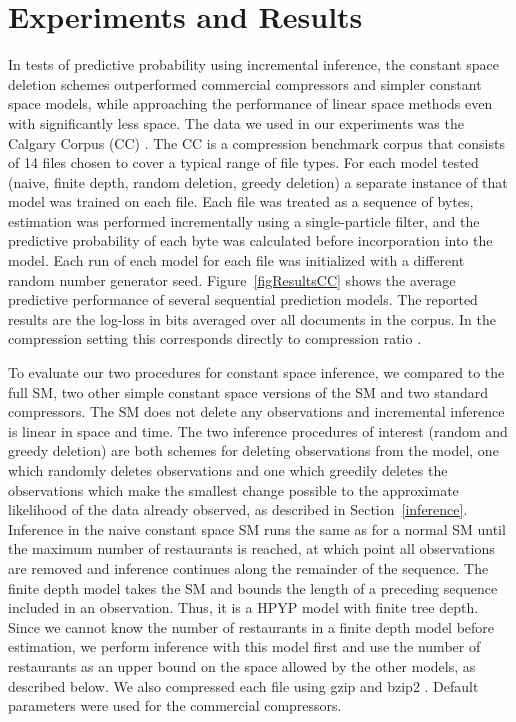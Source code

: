 \section{Experiments and Results}
\label{results}

In tests of predictive probability using incremental inference, the constant space deletion schemes outperformed commercial compressors and simpler constant space models, while approaching the performance of linear space methods even with significantly less space.  The data we used in our experiments was the Calgary Corpus (CC) \cite{Bell1989}.  The CC is a compression benchmark corpus that consists of 14 files chosen to cover a typical range of file types.  For each model tested (naive, finite depth, random deletion, greedy deletion) a separate instance of that model was trained on each file.  Each file was treated as a sequence of bytes, estimation was performed incrementally using a single-particle filter, and the predictive probability of each byte was calculated before incorporation into the model.  Each run of each model for each file was initialized with a different random number generator seed.  Figure~\ref{figResultsCC} shows the average predictive performance of several sequential prediction models.  The reported results are the log-loss in bits averaged over all documents in the corpus.  In the compression setting this corresponds directly to compression ratio \cite{Cover1991}.


To evaluate our two procedures for constant space inference, we compared to the full SM, two other simple constant space versions of the SM and two standard compressors.  The SM does not delete any observations and incremental inference is linear in space and time.  The two inference procedures of interest (random and greedy deletion) are both schemes for deleting observations from the model, one which randomly deletes observations and one which greedily deletes the observations which make the smallest change possible to the approximate likelihood of the data already observed, as described in Section~\ref{inference}.  Inference in the naive constant space SM runs the same as for a normal SM until the maximum number of restaurants is reached, at which point all observations are removed and inference continues along the remainder of the sequence.  The finite depth model takes the SM and bounds the length of a preceding sequence included in an observation.  Thus, it is a HPYP model with finite tree depth.  Since we cannot know the number of restaurants in a finite depth model before estimation, we perform inference with this model first and use the number of restaurants as an upper bound on the space allowed by the other models, as described below.  We also compressed each file using gzip and bzip2 \cite{Deutsch1996, Seward1999}.  Default parameters were used for the commercial compressors.

